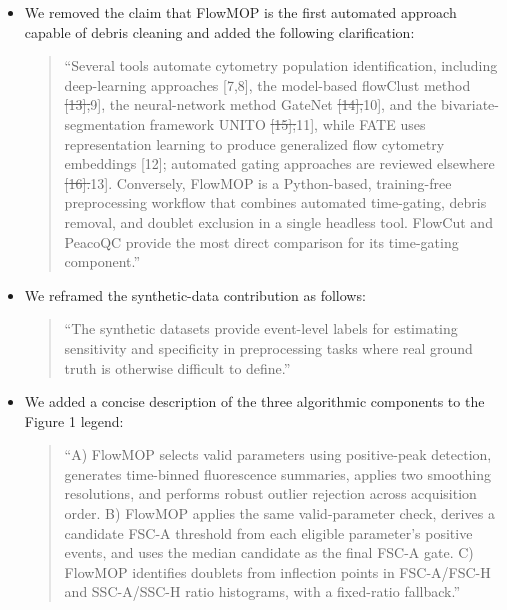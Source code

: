 \documentclass[
  11pt,
  a4paper,
]{article}
\begin{document}
\begin{itemize}
\item
  We removed the claim that FlowMOP is the first automated approach
  capable of debris cleaning and added the following clarification:

  \begin{quote}
  ``Several tools automate cytometry population identification,
  including {\color{revisionblue}deep-learning approaches {[}7,8{]},}
  the model-based flowClust method
  {\color{revisionred}\sout{{[}13{]},}}{\color{revisionblue}{[}9{]},}
  the neural-network method GateNet
  {\color{revisionred}\sout{{[}14{]},}}{\color{revisionblue}{[}10{]},}
  and the bivariate-segmentation framework UNITO
  {\color{revisionred}\sout{{[}15{]};}}{\color{revisionblue}{[}11{]},
  while FATE uses representation learning to produce generalized flow
  cytometry embeddings {[}12{]};} automated gating approaches are
  reviewed elsewhere
  {\color{revisionred}\sout{{[}16{]}.}}{\color{revisionblue}{[}13{]}.
  Conversely,} FlowMOP is a Python-based, training-free preprocessing
  workflow that combines automated time-gating, debris removal, and
  doublet exclusion in a single headless tool. FlowCut and PeacoQC
  provide the most direct comparison for its time-gating component.''
  \end{quote}
\item
  We reframed the synthetic-data contribution as follows:

  \begin{quote}
  ``The synthetic datasets provide event-level labels for estimating
  sensitivity and specificity in preprocessing tasks where real ground
  truth is otherwise difficult to define.''
  \end{quote}
\item
  We added a concise description of the three algorithmic components to
  the Figure 1 legend:

  \begin{quote}
  ``A) FlowMOP selects valid parameters using positive-peak detection,
  generates time-binned fluorescence summaries, applies two smoothing
  resolutions, and performs robust outlier rejection across acquisition
  order. B) FlowMOP applies the same valid-parameter check, derives a
  candidate FSC-A threshold from each eligible parameter's positive
  events, and uses the median candidate as the final FSC-A gate. C)
  FlowMOP identifies doublets from inflection points in FSC-A/FSC-H and
  SSC-A/SSC-H ratio histograms, with a fixed-ratio fallback.''
  \end{quote}
\end{itemize}
\end{document}
